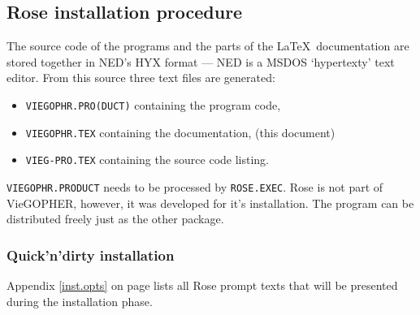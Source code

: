 

\subsection{{\sc Rose} installation procedure}

The source code of the programs and the parts of the \LaTeX\ documentation
are stored together in NED's HYX format --- NED is a MSDOS `hypertexty'
text editor.  From this source three text files are generated:
\begin{itemize}
\item   {\tt VIEGOPHR.PRO(DUCT)} containing the program code,
\item   {\tt VIEGOPHR.TEX} containing the documentation,
        (this document)
\item   {\tt VIEG-PRO.TEX} containing the source code listing.
\end{itemize}

{\tt VIEGOPHR.PRODUCT} needs to be processed by {\tt ROSE.EXEC}.
{\sc Rose} is not part of VieGOPHER, however, it was developed
for it's installation.
The program can be distributed freely just as the other
package.  


\subsubsection{Quick'n'dirty installation}

Appendix \ref{inst.opts} on page \pageref{inst.opts} lists all {\sc Rose}
prompt texts that will be presented during the installation phase.


